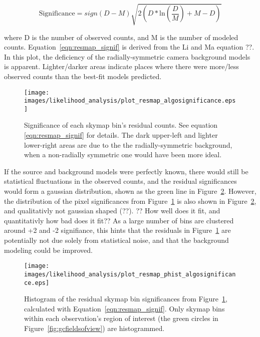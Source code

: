   \begin{equation}\label{eqn:resmap_signif}
    \text{Significance} = sign(D-M) \sqrt{ 2 \left ( D * \textrm{ln} \left ( \frac{D}{M} \right ) + M - D \right ) }
  \end{equation}
  
  where D is the number of observed counts, and M is the number of modeled counts.
  Equation~\ref{eqn:resmap_signif} is derived from the Li and Ma {\color{red}equation ??}. 
  In this plot, the deficiency of the radially-symmetric camera background models is apparent.
  Lighter/darker areas indicate places where there were more/less observed counts than the best-fit models predicted.
  
  \begin{figure}[ht]
    \centering
    \texttt{[image: images/likelihood\_analysis/plot\_resmap\_algosignificance.eps]}
    \caption[Galactic Center Residual Map]
    {
      Significance of each skymap bin's residual counts.
      See equation \ref{eqn:resmap_signif} for details.
      The dark upper-left and lighter lower-right areas are due to the the radially-symmetric background, when a non-radially symmetric one would have been more ideal.
    }
    \label{fig:gc_resmap}
  \end{figure}

  If the source and background models were perfectly known, there would still be statistical fluctuations in the observed counts, and the residual significances would form a gaussian distribution, shown as the green line in Figure~\ref{fig:gc_resmap_sighist}.
  However, the distribution of the pixel significances from Figure~\ref{fig:gc_resmap} is also shown in Figure~\ref{fig:gc_resmap_sighist}, and qualitativly not gaussian shaped {\color{red}(??)}.
  {\color{red}?? How well does it fit, and quantitativly how bad does it fit??}
  As a large number of bins are clustered around +2 and -2 signifiance, this hints that the residuals in Figure~\ref{fig:gc_resmap} are potentially not due solely from statistical noise, and that the background modeling could be improved.
  
  \begin{figure}[ht]
    \centering
    \texttt{[image: images/likelihood\_analysis/plot\_resmap\_phist\_algosignificance.eps]}
    \caption[Galactic Center Residual Histogram]
    {
      Histogram of the residual skymap bin significances from Figure~\ref{fig:gc_resmap}, calculated with Equation~\ref{eqn:resmap_signif}.
      Only skymap bins within each observation's region of interest (the green circles in Figure~\ref{fig:gcfieldsofview}) are histogrammed.
    }
    \label{fig:gc_resmap_sighist}
  \end{figure}

